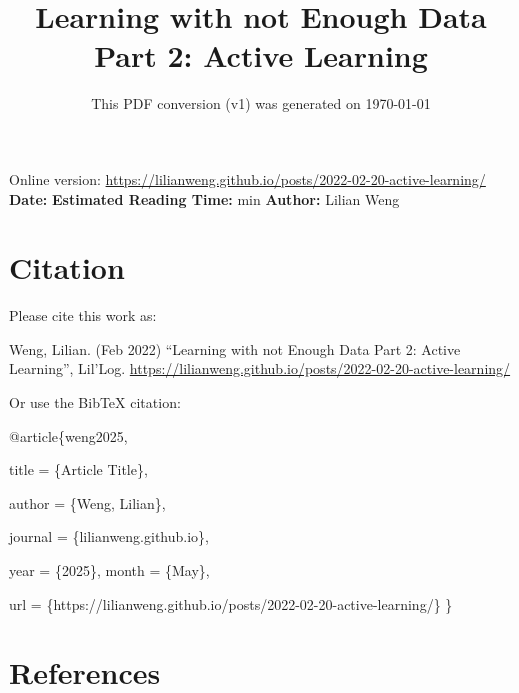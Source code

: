 \documentclass[12pt]{article}
\title{Learning with not Enough Data Part 2: Active Learning}
\date{This PDF conversion (v1) was generated on \today\footnotemark}
\begin{document}
\maketitle
\begin{center}
    Online version: \url{https://lilianweng.github.io/posts/2022-02-20-active-learning/} \\
    \textbf{Date:} \quad
    \textbf{Estimated Reading Time:}  min \quad
    \textbf{Author:} Lilian Weng
\end{center}




\newpage
\tableofcontents
\newpage
\vspace{1em}
\n\n\n\section{Citation}
Please cite this work as:

\begin{tcolorbox}[colback=black!5!white, colframe=black!80!white, boxrule=0.5pt, arc=2mm, left=1mm, right=1mm, top=1mm, bottom=1mm]
  Weng, Lilian. (Feb 2022) ``Learning with not Enough Data Part 2: Active Learning'', Lil'Log. \url{https://lilianweng.github.io/posts/2022-02-20-active-learning/}
  \end{tcolorbox}

Or use the BibTeX citation:

\begin{tcolorbox}[
    colback=black!5!white,
    colframe=black!80!white,
    boxrule=0.5pt,
    arc=2mm,
    left=1mm,
    right=1mm,
    top=1mm,
    bottom=1mm,
    listing only,
    listing options={
      basicstyle=\ttfamily\footnotesize,
      breaklines=true,
      literate={\{}{{\char`\{}}1 {\}}{{\char`\}}}1
    }
  ]
  @article\{weng2025,

    title   = \{Article Title\},

    author  = \{Weng, Lilian\},

    journal = \{lilianweng.github.io\},

    year    = \{2025\},
    month   = \{May\},

    url     = \{https://lilianweng.github.io/posts/2022-02-20-active-learning/\}\n
  \}
  \end{tcolorbox}

\newpage
\section{References}

\n
\end{document}
